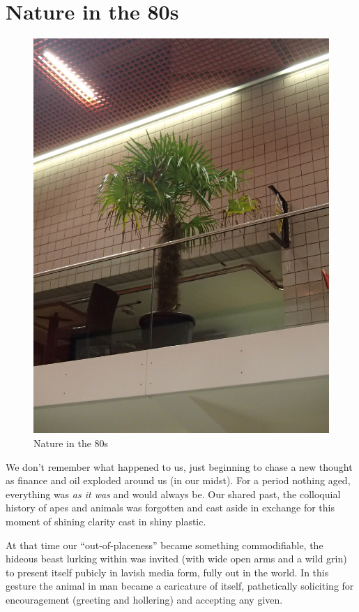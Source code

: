 \documentclass{book}
\begin{document}
\chapter{Nature in the 80s}

\begin{figure}
\centering
\includegraphics[width=\textwidth,angle=-90]{figures/P1050152.JPG}
\caption{Nature in the 80s}
\end{figure}

We don't remember what happened to us, just beginning to chase a new thought as
finance and oil exploded around us (in our midst). For a period nothing aged,
everything was \emph{as it was} and would always be. Our shared past, the
colloquial history of apes and animals was forgotten and cast aside in exchange
for this moment of shining clarity cast in shiny plastic.

At that time our ``out-of-placeness'' became something commodifiable, the
hideous beast lurking within was invited (with wide open arms and a wild grin)
to present itself pubicly in lavish media form, fully out in the world. In this
gesture the animal in man became a caricature of itself, pathetically
soliciting for encouragement (greeting and hollering) and accepting any given.
\end{document}
